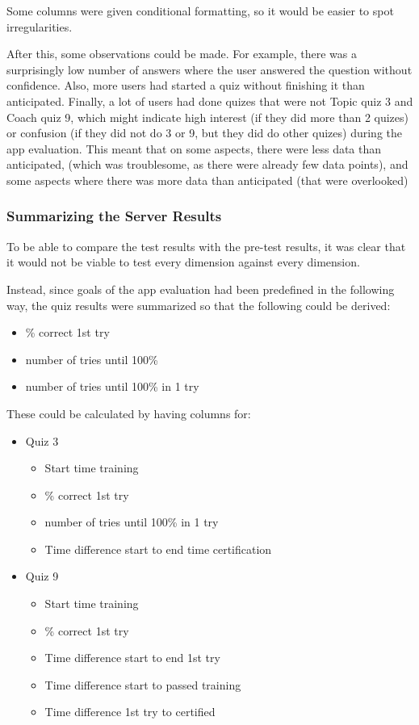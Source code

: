 Some columns were given conditional formatting, so it would be easier to spot irregularities.


After this, some observations could be made. For example, there was a surprisingly low number of answers where the user answered the question without confidence. Also, more users had started a quiz without finishing it than anticipated. Finally, a lot of users had done quizes that were not Topic quiz 3 and Coach quiz 9, which might indicate high interest (if they did more than 2 quizes) or confusion (if they did not do 3 or 9, but they did do other quizes) during the app evaluation. This meant that on some aspects, there were less data than anticipated, (which was troublesome, as there were already few data points), and some aspects where there was more data than anticipated (that were overlooked)

\subsubsection{Summarizing the Server Results}

To be able to compare the test results with the pre-test results, it was clear that it would not be viable to test every dimension against every dimension.

Instead, since goals of the app evaluation had been predefined in the following way, the quiz results were summarized so that the following could be derived:

\begin{itemize}
\item \% correct 1st try
\item number of tries until 100\%
\item number of tries until 100\% in 1 try
\end{itemize}

These could be calculated by having columns for:

\begin{itemize}
  \item Quiz 3
  \begin{itemize}
    \item Start time training
    \item \% correct 1st try
    \item number of tries until 100\% in 1 try
    \item Time difference start to end time certification
  \end{itemize}
  \item Quiz 9
  \begin{itemize}
    \item Start time training
    \item \% correct 1st try
    \item Time difference start to end 1st try
    \item Time difference start to passed training
    \item Time difference 1st try to certified
  \end{itemize}
\end{itemize}

